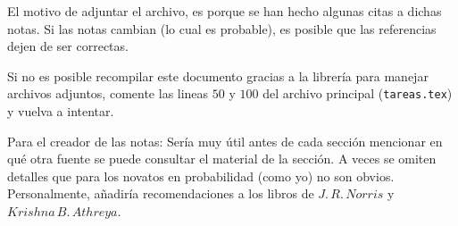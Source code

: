 \documentclass[a5paper,oneside]{amsart}
\theoremstyle{definition}
\numberwithin{section}{part}
\numberwithin{equation}{subsection}
\begin{document}
        El motivo de adjuntar el archivo, es porque se han hecho algunas citas a dichas notas. Si las notas cambian (lo cual es probable), 
        es posible que las referencias dejen de ser correctas.\pn
        
        Si no es posible recompilar este documento gracias a la librería para manejar archivos adjuntos, comente las lineas $50$ y $100$ del archivo 
        principal (\texttt{tareas.tex}) y vuelva a intentar.\pn
        
        Para el creador de las notas: Sería muy útil antes de cada sección mencionar en qué otra fuente se puede consultar el material de
        la sección. A veces se omiten detalles que para los novatos en probabilidad (como yo) no son obvios. Personalmente, añadiría recomendaciones 
        a los libros de $J.\,R.\,Norris$ y $Krishna\,B.\,Athreya$.
\end{document}
